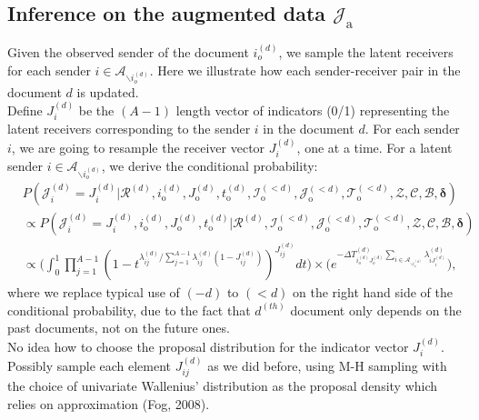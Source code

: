 \documentclass[a4paper]{article}
\begin{document}
  \subsection{Inference on the augmented data $\mathcal{J}_{\mbox{a}}$}
     Given the observed sender of the document $i_o^{(d)}$, we sample the latent receivers for each sender $i \in \mathcal{A}_{\backslash i_o^{(d)}}$. Here we illustrate how each sender-receiver pair in the document $d$ is updated.\\\newline
       Define ${J}^{(d)}_{i}$ be the $(A-1)$ length vector of indicators (0/1) representing the latent receivers corresponding to the sender $i$ in the document $d$. For each sender $i$, we are going to resample the receiver vector ${J}^{(d)}_{i}$, one at a time. For a latent sender $i \in \mathcal{A}_{\backslash i_o^{(d)}}$, we derive the conditional probability:\\
       \begin{equation}
       \begin{aligned}
       &P(\mathcal{J}^{(d)}_{i} = {J}^{(d)}_{i}|\mathcal{R}^{(d)}, i^{(d)}_{\mbox{o}}, J^{(d)}_{\mbox{o}}, t^{(d)}_{\mbox{o}}, \mathcal{I}^{(<d)}_{\mbox{o}}, \mathcal{J}^{(<d)}_{\mbox{o}}, \mathcal{T}^{(<d)}_{\mbox{o}}, \mathcal{Z}, \mathcal{C}, \mathcal{B}, \boldsymbol{\delta})\\&\propto P(\mathcal{J}^{(d)}_{i} ={J}^{(d)}_{i}, i^{(d)}_{\mbox{o}}, J^{(d)}_{\mbox{o}}, t^{(d)}_{\mbox{o}}|\mathcal{R}^{(d)}, \mathcal{I}^{(<d)}_{\mbox{o}}, \mathcal{J}^{(<d)}_{\mbox{o}}, \mathcal{T}^{(<d)}_{\mbox{o}}, \mathcal{Z}, \mathcal{C}, \mathcal{B}, \boldsymbol{\delta})
       \\&\propto  \Big(\int_0^1\prod_{j=1}^{A-1}(1-t^{\lambda_{ij}^{(d)} /  \sum_{j = 1}^{A-1} \lambda_{ij}^{(d)}(1-J_{ij}^{(d)})})^{J_{ij}^{(d)}}dt \Big)\times \Big(e^{-\Delta T^{(d)}_{i_o^{(d)}J_o^{(d)}}\sum\limits_{i\in \mathcal{A}_{\backslash i_o^{(d)}}}\lambda^{(d)}_{iJ^{(d)}_{i}}}\Big),
       \end{aligned}
       \end{equation}
       where we replace typical use of $(-d)$ to $(<d)$ on the right hand side of the conditional probability, due to the fact that $d^{(th)}$ document only depends on the past documents, not on the future ones.\\ \newline
       No idea how to choose the proposal distribution for the indicator vector $J_i^{(d)}$. Possibly sample each element $J_{ij}^{(d)}$ as we did before, using M-H sampling with the choice of univariate Wallenius' distribution as the proposal density which relies on approximation (Fog, 2008).
\end{document}

